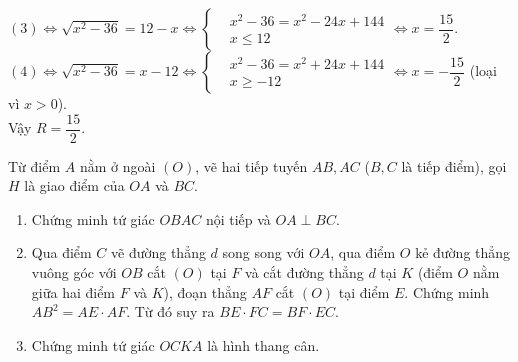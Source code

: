 \begin{ex}
{		$(3) \Leftrightarrow \sqrt{x^2-36}=12-x \Leftrightarrow \begin{cases} &x^2-36=x^2-24x+144 \\ &x \leq 12 \end{cases} \Leftrightarrow x = \dfrac{15}{2}$.\\
		$(4) \Leftrightarrow \sqrt{x^2-36}=x-12 \Leftrightarrow \begin{cases} &x^2-36=x^2+24x+144 \\ &x \geq -12 \end{cases} \Leftrightarrow x = -\dfrac{15}{2}$ (loại vì $x>0$).\\
		Vậy $R=\dfrac{15}{2}$.
	}
\end{ex}

\begin{ex}%
	Từ điểm $A$ nằm ở ngoài $(O)$, vẽ hai tiếp tuyến $AB,AC$ ($B,C$ là tiếp điểm), gọi $H$ là giao điểm của $OA$ và $BC$.
	\begin{enumerate}
		\item Chứng minh tứ giác $OBAC$ nội tiếp và $OA \perp BC$.
		\item Qua điểm $C$ vẽ đường thẳng $d$ song song với $OA$, qua điểm $O$ kẻ đường thẳng vuông góc với $OB$ cắt $(O)$ tại $F$ và cắt đường thẳng $d$ tại $K$ (điểm $O$ nằm giữa hai điểm $F$ và $K$), đoạn thẳng $AF$ cắt $(O)$ tại điểm $E$. Chứng minh $AB^2 =AE \cdot AF$. Từ đó suy ra $BE \cdot FC=BF \cdot EC$.
		\item Chứng minh tứ giác $OCKA$ là hình thang cân.
	\end{enumerate}
\end{ex}
